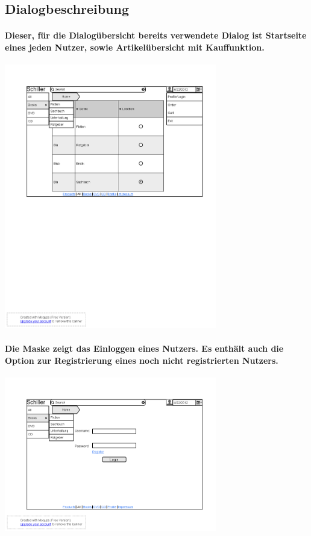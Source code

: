 \documentclass[a4paper]{article}
\begin{document}
\subsection{Dialogbeschreibung}

\paragraph{Dieser, für die Dialogübersicht bereits verwendete Dialog ist Startseite eines jeden Nutzer, sowie Artikelübersicht mit Kauffunktion.\\}
\includegraphics[width=350px]{1Home_Costumer.png}

\paragraph{Die Maske zeigt das Einloggen eines Nutzers. Es enthält auch die Option zur Registrierung eines noch nicht registrierten Nutzers.\\}
\includegraphics[width=350px]{2Login.png}
\end{document}
